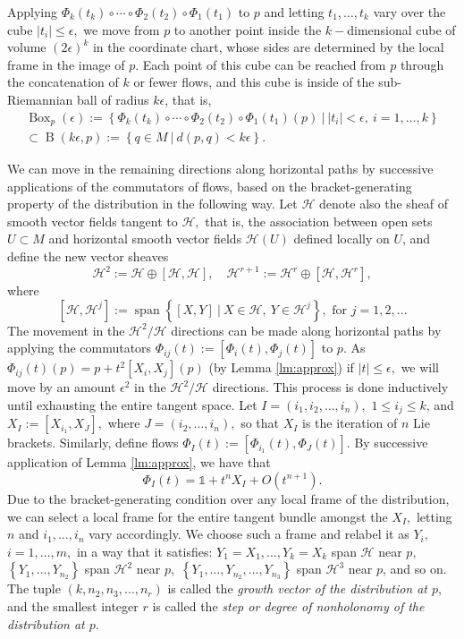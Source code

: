 \documentclass[12pt, letterpaper, reqno]{amsart}
\theoremstyle{definition}
\theoremstyle{plain}
\theoremstyle{remark}
\begin{document}
Applying $ \Phi_k(t_k)\circ\cdots\circ \Phi_2(t_2)\circ\Phi_1(t_1)$ to $ p $ and letting $ t_1,\dots,t_k $ vary over the cube $ |t_i|\leq\epsilon, $ we move from $ p $ to another point inside the $ k- $dimensional  cube of volume $ (2\epsilon)^k$ in the coordinate chart, whose sides are determined by the local frame in the image of $ p $. Each point of this cube can be reached from $ p $ through the concatenation of $ k $ or fewer flows, and this cube is inside of the sub-Riemannian ball of radius $ k\epsilon $, that is,
\begin{align*}
 \operatorname{Box}_p(\epsilon):= \left\{ \Phi_k(t_k)\circ\cdots\circ \Phi_2(t_2)\circ\Phi_1(t_1)(p) \ | \ |t_i|<\epsilon, \ i=1,\dots,k \right\}\\ \subset \operatorname{B}(k\epsilon, p):= \left\{ q\in M \ | \ d(p,q)<k\epsilon \right\}.  
\end{align*}

We can move in the remaining directions along horizontal paths by successive applications of the commutators of flows, based on the bracket-generating property of the distribution in the following way. Let $ \mathcal{H} $ denote also the sheaf of smooth vector fields tangent to $ \mathcal{H}, $ that is, the association between open sets $ U\subset M $ and horizontal smooth vector fields $ \mathcal{H}(U) $ defined locally on $ U $, and define the new vector sheaves
$$ \mathcal{H}^2 := \mathcal{H}\oplus [\mathcal{H},\mathcal{H}],\quad \mathcal{H}^{r+1} := \mathcal{H}^r\oplus [\mathcal{H}, \mathcal{H}^r], $$
where
$$ \left[ \mathcal{H}, \mathcal{H}^j \right]:= \operatorname{span} \left\{ [X,Y] \ | \ X\in \mathcal{H},\ Y \in \mathcal{H}^j \right\}, \text{ for }j=1,2,\dots  $$ 
The movement in the $ \mathcal{H}^2/\mathcal{H} $ directions can be made along horizontal paths by applying the commutators $ \Phi_{ij}(t):= [\Phi_i(t),\Phi_j(t)] $ to $ p. $ As $ \Phi_{ij}(t)(p)=p+t^2[X_i, X_j](p) $ (by Lemma \ref{lm:approx}) if $ |t|\leq\epsilon, $ we will move by an amount $ \epsilon^2 $ in the $ \mathcal{H}^2/\mathcal{H} $ directions. This process is done inductively until exhausting the entire tangent space. Let $ I=(i_1,i_2,\dots,i_n), $ $ 1\leq i_j\leq k $, and $ X_I:=[X_{i_1}, X_J], $ where $ J=(i_2,\dots,i_n), $  so that $ X_I $ is the iteration of $ n $ Lie brackets. Similarly, define flows $ \Phi_I(t):=[\Phi_{i_1}(t), \Phi_J(t)] $. By successive application of Lemma \ref{lm:approx}, we have that   
$$ \Phi_I(t)= \mathbb{1} +t^n X_I+ O(t^{n+1}).$$ 
Due to the bracket-generating condition over any local frame of the distribution, we can select a local frame for the entire tangent bundle amongst the $ X_I, $ letting $ n $ and $ i_1,\dots,i_n $ vary accordingly. We choose such a frame and relabel it as $ Y_i, $ $ i=1,\dots,m, $ in a way that it satisfies: $ Y_1=X_1,\dots, Y_k=X_k $ span $ \mathcal{H} $ near $ p, $ $ \left\{ Y_1,\dots,Y_{n_2} \right\} $ span $ \mathcal{H}^2 $ near $ p, $ $ \left\{ Y_1,\dots,Y_{n_2},\dots,Y_{n_3} \right\} $ span $ \mathcal{H}^3 $ near $ p $,  and so on. The tuple $ (k,n_2,n_3,\dots, n_r) $ is called the \textit{growth vector of the distribution at $ p $}, and the smallest integer $ r $ is called the \textit{step or degree of nonholonomy of the distribution at $ p. $ }   
\end{document}
